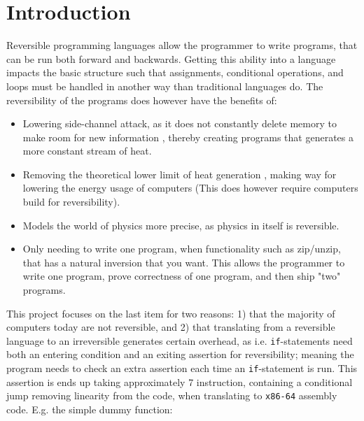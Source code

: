 
\section{Introduction \rr}
Reversible programming languages allow the programmer to write programs, that can be run
both forward and backwards. Getting this ability into a language impacts the basic structure
such that assignments, conditional operations, and loops must be handled in another way
than traditional languages do. The reversibility of the programs does however have the benefits
of:

\begin{itemize}
    \item Lowering side-channel attack, as it does not constantly delete memory to make room for
    new information \cite{hermes}, thereby creating programs that generates a more constant
    stream of heat.

    \item Removing the theoretical lower limit of heat generation \cite{article:3}, making way
    for lowering the energy usage of computers (This does however require computers build
    for reversibility).

    \item Models the world of physics more precise, as physics in itself is reversible.

    \item Only needing to write one program, when functionality such as zip/unzip, that has
    a natural inversion that you want. This allows the programmer to write one program, prove
    correctness of one program, and then ship "two" programs.
\end{itemize}
\noindent
This project focuses on the last item for two reasons: 1) that the majority of computers today are
not reversible, and 2) that translating from a reversible language to an irreversible
generates certain overhead, as i.e. \texttt{if}-statements need both an entering condition and an
exiting assertion for reversibility; meaning the program needs to check an extra assertion each
time an \texttt{if}-statement is run. This assertion is ends up taking approximately 7 instruction,
containing a conditional jump removing linearity from the code, when translating to
\texttt{x86-64} assembly code. E.g. the simple dummy function:

